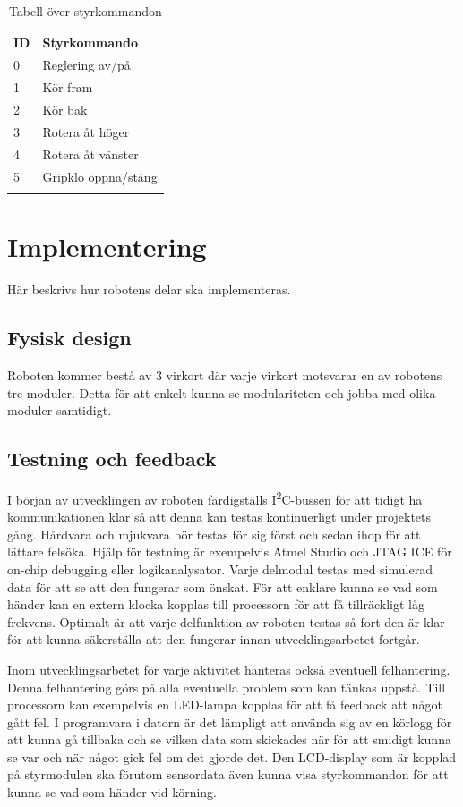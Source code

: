 \documentclass[11pt]{article}
\begin{document}
\begin{flushleft}
\begin{longtable}[l]{| l | l |} \hline
\textbf{ID} & \textbf{Styrkommando} \\ \hline 
0 & Reglering av/på \\ \hline
1 & Kör fram \\ \hline
2 & Kör bak \\ \hline
3 & Rotera åt höger \\ \hline
4 & Rotera åt vänster \\ \hline
5 & Gripklo öppna/stäng \\ \hline

\caption{Tabell över styrkommandon}\label{styrtab}
\end{longtable}


\pagebreak
\section{Implementering}
Här beskrivs hur robotens delar ska implementeras. 


\subsection{Fysisk design}
Roboten kommer bestå av 3 virkort där varje virkort motsvarar en av robotens tre moduler. Detta för att enkelt kunna se modulariteten och jobba med olika moduler samtidigt.

\subsection{Testning och feedback}
I början av utvecklingen av roboten färdigställs I\textsuperscript{2}C-bussen för att tidigt ha kommunikationen klar så att denna kan testas kontinuerligt under projektets gång. Hårdvara och mjukvara bör testas för sig först och sedan ihop för att lättare felsöka. Hjälp för testning är exempelvis Atmel Studio och JTAG ICE för on-chip debugging eller logikanalysator. Varje delmodul testas med simulerad data för att se att den fungerar som önskat. För att enklare kunna se vad som händer kan en extern klocka kopplas till processorn för att få tillräckligt låg frekvens. Optimalt är att varje delfunktion av roboten testas så fort den är klar för att kunna säkerställa att den fungerar innan utvecklingsarbetet fortgår.  

Inom utvecklingsarbetet för varje aktivitet hanteras också eventuell felhantering. Denna felhantering görs på alla eventuella problem som kan tänkas uppstå. Till processorn kan exempelvis en LED-lampa kopplas för att få feedback att något gått fel. I programvara i datorn är det lämpligt att använda sig av en körlogg för att kunna gå tillbaka och se vilken data som skickades när för att smidigt kunna se var och när något gick fel om det gjorde det. Den LCD-display som är kopplad på styrmodulen ska förutom sensordata även kunna visa styrkommandon för att kunna se vad som händer vid körning.


\end{flushleft}
\end{document}

